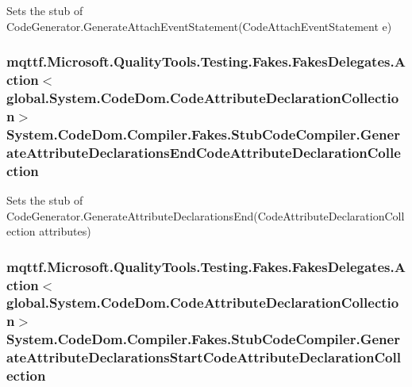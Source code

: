 Sets the stub of Code\-Generator.\-Generate\-Attach\-Event\-Statement(\-Code\-Attach\-Event\-Statement e)

\hypertarget{class_system_1_1_code_dom_1_1_compiler_1_1_fakes_1_1_stub_code_compiler_ae0dd577038eb1d6c9e40aec1ef7c3bea}{
\subsubsection[{Generate\-Attribute\-Declarations\-End\-Code\-Attribute\-Declaration\-Collection}]{\setlength{\rightskip}{0pt plus 5cm}mqttf.\-Microsoft.\-Quality\-Tools.\-Testing.\-Fakes.\-Fakes\-Delegates.\-Action$<$global.\-System.\-Code\-Dom.\-Code\-Attribute\-Declaration\-Collection$>$ System.\-Code\-Dom.\-Compiler.\-Fakes.\-Stub\-Code\-Compiler.\-Generate\-Attribute\-Declarations\-End\-Code\-Attribute\-Declaration\-Collection}}\label{class_system_1_1_code_dom_1_1_compiler_1_1_fakes_1_1_stub_code_compiler_ae0dd577038eb1d6c9e40aec1ef7c3bea}


Sets the stub of Code\-Generator.\-Generate\-Attribute\-Declarations\-End(\-Code\-Attribute\-Declaration\-Collection attributes)

\hypertarget{class_system_1_1_code_dom_1_1_compiler_1_1_fakes_1_1_stub_code_compiler_a33f019171fcad21c62cf41b8e7fa40d1}{
\subsubsection[{Generate\-Attribute\-Declarations\-Start\-Code\-Attribute\-Declaration\-Collection}]{\setlength{\rightskip}{0pt plus 5cm}mqttf.\-Microsoft.\-Quality\-Tools.\-Testing.\-Fakes.\-Fakes\-Delegates.\-Action$<$global.\-System.\-Code\-Dom.\-Code\-Attribute\-Declaration\-Collection$>$ System.\-Code\-Dom.\-Compiler.\-Fakes.\-Stub\-Code\-Compiler.\-Generate\-Attribute\-Declarations\-Start\-Code\-Attribute\-Declaration\-Collection}}\label{class_system_1_1_code_dom_1_1_compiler_1_1_fakes_1_1_stub_code_compiler_a33f019171fcad21c62cf41b8e7fa40d1}



